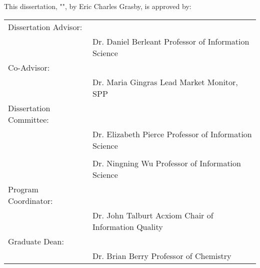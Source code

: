 %
%
%
%  
%



\pagestyle{plain} %
\setcounter{page}{1}

\noindent This dissertation, "\tamumanuscripttitle", by Eric Charles Grasby, is approved by:

\begin{table}[h]
    \centering
    \begin{tabularx}{\textwidth}{X X}
        \vspace{16pt}
        Dissertation Advisor: \\ & \hline \newline Dr. Daniel Berleant \newline Professor of Information Science \\
        \vspace{16pt}
        Co-Advisor: \\ & \hline \newline Dr. Maria Gingras \newline Lead Market Monitor, SPP  \\
        \vspace{16pt}
        Dissertation Committee:  \\ & \hline \newline Dr. Elizabeth Pierce \newline Professor of Information Science \\
        \vspace{16pt}
        \hfill \\ & \hline \newline Dr. Ningning Wu \newline Professor of Information Science  \\
        \vspace{16pt}
        Program Coordinator: \\ & \hline \newline Dr. John Talburt \newline Acxiom Chair of Information Quality \\
        \vspace{16pt}
        Graduate Dean: \\ & \hline \newline Dr. Brian Berry \newline Professor of Chemistry
        \vspace{1pt}
    \end{tabularx}
\end{table}


\pagebreak{}